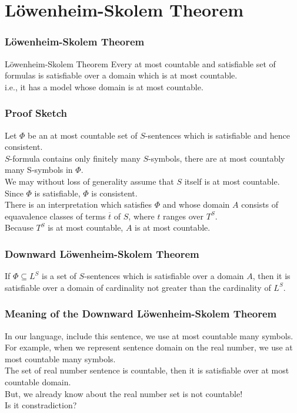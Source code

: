 \section{L\"owenheim-Skolem Theorem}

\begin{frame}
    \frametitle{L\"owenheim-Skolem Theorem}

    \begin{block}{L\"owenheim-Skolem Theorem}
        Every at most countable and satisfiable set of formulas is satisfiable over a domain which is at most countable. \\
        i.e., it has a model whose domain is at most countable.
    \end{block}
    
\end{frame}

\begin{frame}
    \frametitle{Proof Sketch}
    
    Let $\Phi$ be an at most countable set of $S$-sentences which is satisfiable and hence consistent. \\
    $S$-formula contains only finitely many $S$-symbols, there are at most countably many S-symbols in $\Phi$. \\
    We may without loss of generality assume that $S$ itself is at most countable. \\
    Since $\Phi$ is satisfiable, $\Phi$ is consistent. \\
    There is an interpretation which satisfies $\Phi$ and whose domain $A$ consists of equavalence classes of terms $\overline{t}$ of $S$, where $t$ ranges over $T^S$. \\
    Because $T^S$ is at most countable, $A$ is at most countable. \\
\end{frame}

\begin{frame}
    \frametitle{Downward L\"owenheim-Skolem Theorem}
    
    \begin{Theorem}
        If $\Phi \subseteq L^S$ is a set of $S$-sentences which is satisfiable over a domain $A$, 
        then it is satisfiable over a domain of cardinality not greater than the cardinality of $L^S$.
    \end{Theorem}

\end{frame}

\begin{frame}
    \frametitle{Meaning of the Downward L\"owenheim-Skolem Theorem}
    
    In our language, include this sentence, we use at most countable many symbols. \\
    For example, when we represent sentence domain on the real number, we use at most countable many symbols. \\
    The set of real number sentence is countable, then it is satisfiable over at most countable domain. \\
    But, we already know about the real number set is not countable! \\
    Is it constradiction?
\end{frame}